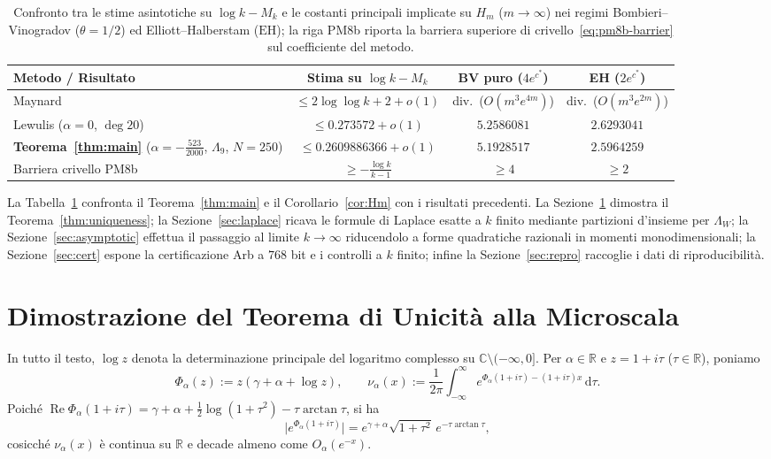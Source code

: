 \documentclass[11pt, reqno]{amsart}
\theoremstyle{remark}
\numberwithin{equation}{section}
\DeclareMathOperator{\re}{Re}
\newcommand{\R}{\mathbb{R}}
\newcommand{\C}{\mathbb{C}}
\newcommand{\dd}{\,\mathrm{d}}
\begin{document}
\begin{table}[ht]
\centering
\caption{Confronto tra le stime asintotiche su $\log k - M_k$ e le costanti principali
implicate su $H_m$ ($m \to \infty$) nei regimi Bombieri--Vinogradov ($\theta = 1/2$) ed
Elliott--Halberstam ($\mathrm{EH}$); la riga PM8b riporta la barriera superiore di crivello~\eqref{eq:pm8b-barrier} sul coefficiente del metodo.}\label{tab:summary}
\small
\setlength{\tabcolsep}{4.5pt}
\begin{tabular}{@{}lccc@{}}
\toprule
Metodo / Risultato & Stima su $\log k - M_k$ & BV puro ($4e^{c^*}$) & EH ($2e^{c^*}$) \\
\midrule
Maynard \cite{Maynard} & $\le 2\log\log k + 2 + o(1)$ & div.\ ($O(m^3 e^{4m})$) & div.\ ($O(m^3 e^{2m})$) \\
Lewulis \cite{Lewulis} ($\alpha = 0$, $\deg 20$) & $\le 0.273572 + o(1)$ & $5.2586081$ & $2.6293041$ \\
\textbf{Teorema~\ref{thm:main}} ($\alpha = -\tfrac{523}{2000}$, $\Lambda_9$, $N = 250$) & $\mathbf{\le 0.2609886366} + o(1)$ & $\mathbf{5.1928517}$ & $\mathbf{2.5964259}$ \\
\midrule
Barriera crivello PM8b \cite{PM8b} & $\ge -\tfrac{\log k}{k-1}$ & $\ge 4$ & $\ge 2$ \\
\bottomrule
\end{tabular}
\end{table}

La Tabella~\ref{tab:summary} confronta il Teorema~\ref{thm:main} e il Corollario~\ref{cor:Hm} con i
risultati precedenti. La Sezione~\ref{sec:uniqueness} dimostra il Teorema~\ref{thm:uniqueness}; la Sezione~\ref{sec:laplace}
ricava le formule di Laplace esatte a $k$ finito mediante partizioni d'insieme per $\Lambda_W$;
la Sezione~\ref{sec:asymptotic} effettua il passaggio al limite $k \to \infty$ riducendolo a forme
quadratiche razionali in momenti monodimensionali; la Sezione~\ref{sec:cert} espone la certificazione
Arb a $768$ bit e i controlli a $k$ finito; infine la Sezione~\ref{sec:repro} raccoglie i dati di
riproducibilità.

\section{Dimostrazione del Teorema di Unicità alla Microscala}\label{sec:uniqueness}

In tutto il testo, $\log z$ denota la determinazione principale del logaritmo complesso su
$\C \setminus (-\infty, 0]$. Per $\alpha \in \R$ e $z = 1 + i\tau$ ($\tau \in \R$), poniamo
\begin{equation}\label{eq:Phi-nu-def}
\Phi_\alpha(z) := z(\gamma + \alpha + \log z),
\qquad
\nu_\alpha(x) := \frac{1}{2\pi}\int_{-\infty}^\infty e^{\Phi_\alpha(1+i\tau) - (1+i\tau)x}\dd\tau.
\end{equation}
Poiché $\re\Phi_\alpha(1+i\tau) = \gamma + \alpha + \frac{1}{2}\log(1+\tau^2) - \tau\arctan\tau$, si ha
\begin{equation}\label{eq:Phi-abs}
\bigl|e^{\Phi_\alpha(1+i\tau)}\bigr|
= e^{\gamma+\alpha} \sqrt{1+\tau^2}\, e^{-\tau\arctan\tau},
\end{equation}
cosicché $\nu_\alpha(x)$ è continua su $\R$ e decade almeno come $O_\alpha(e^{-x})$.
\end{document}
